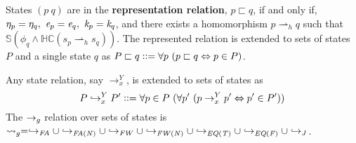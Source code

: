 \begin{definition}
\label{representation}
States $(p\ q)$ are in the \textbf{representation relation}, $p \sqsubset q$, if and only if, $\eta_p = \eta_q ,\ \cfgnt{e}_p =
\cfgnt{e}_q ,\ \cfgnt{k}_p = \cfgnt{k}_q$, and there exists a
homomorphism $p \rightharpoonup_{h} q$
such that $\mathbb{S}( \phi_q \wedge \mathbb{HC}(s_p \rightharpoonup_{h} s_q) )$.
The represented relation is extended to sets of states $P$ and a single state $q$ as
$P \sqsubset q \vcentcolon \vcentcolon= \forall p\ (p \sqsubset q \Leftrightarrow p \in P)$.
\end{definition}



\begin{definition}
\label{def:meta}
Any state relation, say $\rightarrow_x^Y$, is extended to sets of states as
$$
P \hookrightarrow_x^Y P^\prime \defeq \forall p \in P\ (\forall p^\prime\ (p \rightarrow_x^Y p^\prime \Leftrightarrow p^\prime \in P^\prime))
$$
The $\rightarrow_{g}$ relation over sets of states is $\leadsto_{g} = \hookrightarrow_\mathit{FA} \cup \hookrightarrow_\mathit{FA(N)} \cup \hookrightarrow_\mathit{FW} \cup \hookrightarrow_\mathit{FW(N)} \cup \hookrightarrow_\mathit{EQ(T)} \cup \hookrightarrow_\mathit{EQ(F)} \cup \hookrightarrow_{J}$.%
\end{definition}


